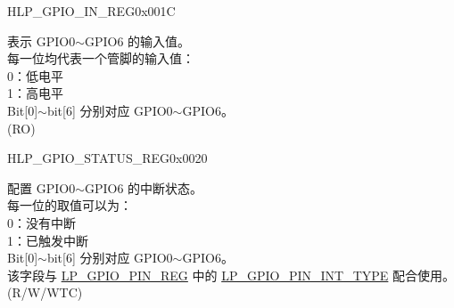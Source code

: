 \begin{register}{H}{LP\_GPIO\_IN\_REG}{0x001C}\label{regdesc:LPGPIOINREG}
%
%
\regnewline%
\begin{regdesc}\begin{reglist}
\label{fielddesc:LPGPIOINDATANEXT}\item [LP\_GPIO\_IN\_DATA\_NEXT] 表示 GPIO0$\sim$GPIO6 的输入值。\\
每一位均代表一个管脚的输入值：\\
0：低电平\\
1：高电平\\
Bit[0]$\sim$bit[6] 分别对应 GPIO0$\sim$GPIO6。\\ (RO)
\end{reglist}\end{regdesc}
\end{register}


\begin{register}{H}{LP\_GPIO\_STATUS\_REG}{0x0020}\label{regdesc:LPGPIOSTATUSREG}
%
%
\regnewline%
\begin{regdesc}\begin{reglist}
\label{fielddesc:LPGPIOSTATUSINTERRUPT}\item [LP\_GPIO\_STATUS\_INTERRUPT] 配置 GPIO0$\sim$GPIO6 的中断状态。\\
每一位的取值可以为：\\
0：没有中断\\
1：已触发中断\\
Bit[0]$\sim$bit[6] 分别对应 GPIO0$\sim$GPIO6。\\
该字段与 \hyperref[regdesc:LPGPIOPINNREG]{LP\_GPIO\_PIN\_REG} 中的 \hyperref[fielddesc:LPGPIOPINNINTTYPE]{LP\_GPIO\_PIN\_INT\_TYPE} 配合使用。\\
 (R/W/WTC)
\end{reglist}\end{regdesc}
\end{register}


